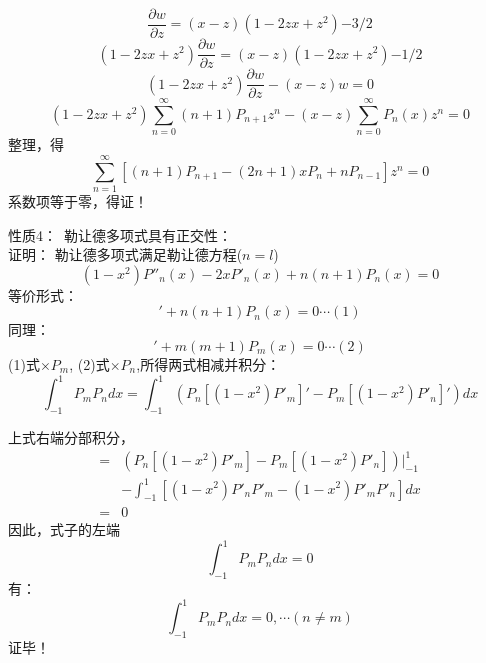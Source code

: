 \begin{frame}
	\begin{equation*}
		\frac{\partial w}{\partial z}=	(x-z)(1-2zx+z^2){-3/2}
	\end{equation*}		
	\begin{equation*}
		(1-2zx+z^2)\frac{\partial w}{\partial z}=(x-z)(1-2zx+z^2){-1/2}
	\end{equation*}		
	\begin{equation*}
		(1-2zx+z^2)\frac{\partial w}{\partial z}-(x-z)w=0
	\end{equation*}		
	\begin{equation*}
		(1-2zx+z^2)\sum_{n=0}^{\infty}(n+1) P_{n+1} z^{n}-(x-z)\sum_{n=0}^{\infty} P_{n}(x) z^{n}=0
	\end{equation*}		
	整理，得
	\begin{equation*}
		\sum_{n=1}^{\infty} [(n+1)P_{n+1} -(2n+1)x P_n + nP_{n-1} ] z^{n}=0
	\end{equation*}		
	系数项等于零，\alert{得证！}   	  
\end{frame}	

\begin{frame}
	\alert{性质4：}~勒让德多项式具有正交性：\\
	\alert{证明：}  勒让德多项式满足勒让德方程($n=l$)
	\begin{equation*}
		\left(1-x^{2}\right) P'' _n  (x) -2 x P' _n (x)+n(n+1)P_n(x)=0
	\end{equation*}		
	等价形式：
	\begin{equation*}
		[\left(1-x^{2}\right) P' _n  (x)]' +n(n+1)P_n(x)=0    \cdots  (1)
	\end{equation*}		
	同理：
	\begin{equation*}
		[\left(1-x^{2}\right) P' _m  (x)]' + m (m+1)P_m(x)=0    \cdots  (2)
	\end{equation*}		
	(1)式$\times P_m$, (2)式$\times P_n$,所得两式相减并积分： 
	{\small \begin{equation*}
			[n(n+1) -m (m+1)]\int_{-1}^{1} P_mP_n dx =\int_{-1}^{1} (P_n [\left(1-x^{2}\right) P' _m] '-P_m [\left(1-x^{2}\right) P' _n ]')dx
	\end{equation*}		}
\end{frame}	

\begin{frame}
	上式右端分部积分，
	\begin{equation*}
	\begin{split}
		= &(P_n [\left(1-x^{2}\right) P' _m] - P_m [\left(1-x^{2}\right) P' _n ])|_{-1} ^{1} \\ 
		&-\int_{-1}^{1}  [\left(1-x^{2}\right) P' _nP' _m -\left(1-x^{2}\right) P' _mP' _n  ]  dx \\
		=&0
	\end{split}
	\end{equation*}		
	因此，式子的左端
	\begin{equation*}
		[n(n+1) -m (m+1)]\int_{-1}^{1} P_mP_n dx =0
	\end{equation*}	
	有：
	\begin{equation*}
		\int_{-1}^{1} P_mP_n dx =0 ,\cdots (n\ne m)
	\end{equation*}	
	\alert{证毕！} 
\end{frame}	

